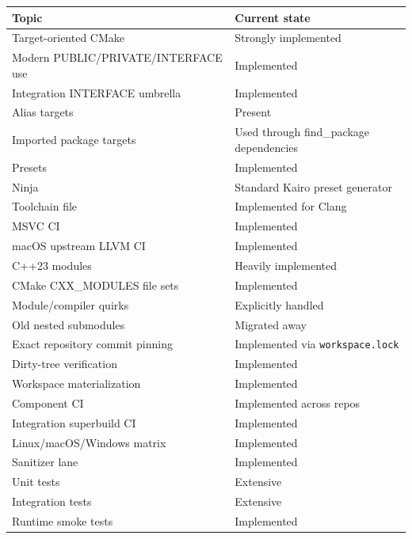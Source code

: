 {\def\LTcaptype{none} %
\begin{longtable}[]{@{}
  >{\raggedright\arraybackslash}p{}
  >{\raggedright\arraybackslash}p{}@{}}
\toprule\noalign{}
\begin{minipage}[b]{\linewidth}\raggedright
Topic
\end{minipage} & \begin{minipage}[b]{\linewidth}\raggedright
Current state
\end{minipage} \\
\midrule\noalign{}
\endhead
\bottomrule\noalign{}
\endlastfoot
Target-oriented CMake & Strongly implemented \\
Modern PUBLIC/PRIVATE/INTERFACE use & Implemented \\
Integration INTERFACE umbrella & Implemented \\
Alias targets & Present \\
Imported package targets & Used through find\_package dependencies \\
Presets & Implemented \\
Ninja & Standard Kairo preset generator \\
Toolchain file & Implemented for Clang \\
MSVC CI & Implemented \\
macOS upstream LLVM CI & Implemented \\
C++23 modules & Heavily implemented \\
CMake CXX\_MODULES file sets & Implemented \\
Module/compiler quirks & Explicitly handled \\
Old nested submodules & Migrated away \\
Exact repository commit pinning & Implemented via \texttt{workspace.lock} \\
Dirty-tree verification & Implemented \\
Workspace materialization & Implemented \\
Component CI & Implemented across repos \\
Integration superbuild CI & Implemented \\
Linux/macOS/Windows matrix & Implemented \\
Sanitizer lane & Implemented \\
Unit tests & Extensive \\
Integration tests & Extensive \\
Runtime smoke tests & Implemented \\

\end{longtable}}
